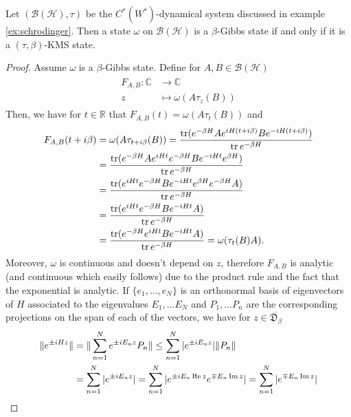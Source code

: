 \begin{theorem}\label{thm:gibbs}
Let $(\mathcal{B}(\mathcal{H}),\tau)$ be the $C^*(W^*)$-dynamical system discussed in example \ref{ex:schrodinger}. Then a state $\omega$ on $\mathcal{B}(\mathcal{H})$ is a $\beta$-Gibbs state if and only if it is a $(\tau,\beta)$-KMS state.  
\end{theorem}

\begin{proof}
Assume $\omega$ is a $\beta$-Gibbs state. Define for $A,B\in\mathcal{B}(\mathcal{H})$
\begin{align}
\begin{split}
F_{A,B}:\mathbb{C}&\rightarrow\mathbb{C} \\
z&\mapsto \omega(A\tau_z(B))
\end{split}
\end{align}
Then, we have for $t\in\mathbb{R}$ that $F_{A,B}(t)=\omega(A\tau_t(B))$ and 
\begin{align}
\begin{split}
F_{A,B}(t+i\beta)& =\omega(A\tau_{t+i\beta}(B))=\frac{\operatorname{tr}(e^{-\beta H}Ae^{iH(t+i\beta)}Be^{-iH(t+i\beta)})}{\operatorname{tr} e^{-\beta H}} \\
&= \frac{\operatorname{tr}(e^{-\beta H}Ae^{iHt}e^{-\beta H}Be^{-iHt}e^{\beta H})}{\operatorname{tr} e^{-\beta H}} \\
&= \frac{\operatorname{tr}(e^{iHt}e^{-\beta H}Be^{-iHt}e^{\beta H}e^{-\beta H}A)}{\operatorname{tr} e^{-\beta H}} \\
&= \frac{\operatorname{tr}(e^{iHt}e^{-\beta H}Be^{-iHt}A)}{\operatorname{tr} e^{-\beta H}} \\
&= \frac{\operatorname{tr}(e^{-\beta H}e^{iHt}Be^{-iHt}A)}{\operatorname{tr} e^{-\beta H}} = \omega(\tau_t(B)A).
\end{split} 
\end{align}
Moreover, $\omega$ is continuous and doesn't depend on $z$, therefore $F_{A,B}$ is analytic (and continuous which easily follows) due to the product rule and the fact that the exponential is analytic. 
If $\{e_1,\dots,e_N\}$ is an orthonormal basis of eigenvectors of $H$ associated to the eigenvalues $E_1,\dots E_N$ and $P_1,\dots P_n$ are the corresponding projections on the span of each of the vectors, we have for $z\in \overline{\mathfrak{D}_\beta}$
\begin{align}
\begin{split}
\|e^{\pm iHz}\|&=\|\sum_{n=1}^N e^{\pm iE_n z}P_n\|\leq\sum_{n=1}^N |e^{\pm iE_n z}|\|P_n\| \\
&=\sum_{n=1}^N |e^{\pm iE_n z}|=\sum_{n=1}^N |e^{\pm iE_n \re z}e^{\mp E_n \im z}|=\sum_{n=1}^N |e^{\mp E_n \im z}| \\

\end{split}
\end{align}
\end{proof}
